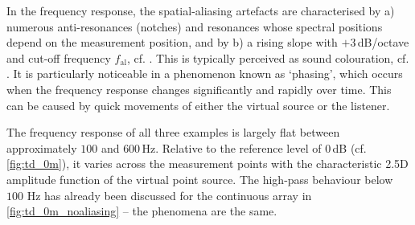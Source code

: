 In the frequency response, the spatial-aliasing artefacts are characterised
by a) numerous anti-resonances (notches) and resonances whose spectral positions
depend on the measurement position,
and by b) a rising slope with $+3$\,dB/octave and cut-off frequency $f_\text{al}$,
cf. \cite{Spors2010a}.
%
This is typically perceived as sound colouration, cf. \cite{Start1997_diss,
Wittek2007_JAES, Wierstorf2014_diss, Winter2019_diss, Erbes2020_diss}.
%
It is particularly noticeable in a phenomenon known as `phasing', which
occurs when the frequency response changes significantly and rapidly over
time.
This can be caused by quick movements of either the virtual source or the
listener.



The frequency response of all three examples is largely flat
between approximately $100$ and $600$\,Hz.
Relative to the reference level of $0$\,dB (cf. \myfig\ref{fig:td_0m}),
it varies across the measurement points with the characteristic 2.5D amplitude
function of the virtual point source.
%
The high-pass behaviour below $100$ Hz has already been discussed
for the continuous array in \myfig\ref{fig:td_0m_noaliasing} -- the
phenomena are the same.



